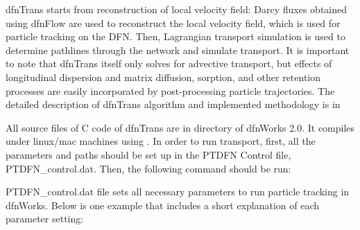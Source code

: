 \documentclass[letterpaper,10pt,english]{sphinxmanual}
\begin{document}
dfnTrans starts from  reconstruction of local velocity field: Darcy fluxes
obtained using dfnFlow are used to reconstruct the local velocity field, which
is used for particle tracking on the DFN. Then, Lagrangian transport simulation
is used to determine pathlines through the network and simulate transport. It is
important to note that dfnTrans itself only solves for advective transport, but
effects of longitudinal dispersion and matrix diffusion, sorption, and other
retention processes are easily incorporated by post-processing particle
trajectories. The detailed description of dfnTrans algorithm and implemented
methodology is in 

All source files of C code of dfnTrans are in  directory of
dfnWorks 2.0. It compiles under linux/mac machines using .  In order
to run transport, first, all the parameters and paths should be set up in the
PTDFN Control file, PTDFN\_control.dat. Then, the following command should be
run:


PTDFN\_control.dat file sets all necessary parameters to run particle tracking in
dfnWorks.  Below is one  example that includes a short
explanation of each parameter setting:
\end{document}
